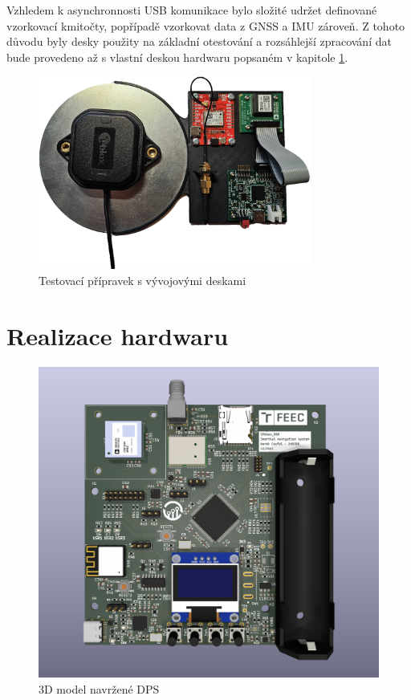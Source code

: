 Vzhledem k asynchronnosti USB komunikace bylo složité udržet definované vzorkovací kmitočty, popřípadě vzorkovat data z GNSS a IMU zároveň. Z tohoto důvodu byly desky použity na základní otestování a rozsáhlejší zpracování dat bude provedeno až s vlastní deskou hardwaru popsaném v kapitole \ref{hardware}.
\begin{figure}[h] 
    \centering
    \includegraphics[width=0.8\textwidth]{obrazky/devBoards}
    \caption{Testovací přípravek s vývojovými deskami}
    \label{fig:devBoards}
\end{figure}

\chapter{Realizace hardwaru} \label{hardware}
\begin{figure}[h]
    \centering
    \includegraphics[width=\textwidth]{KiCad/3Dboard}
    \caption{3D model navržené DPS}
    \label{fig:3Dboard}
\end{figure}

